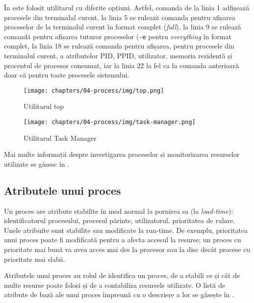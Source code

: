 În  este folosit utilitarul  cu diferite opțiuni.
Astfel, comanda de la linia 1 adfișează procesele din terminalul curent, la linia 5 se rulează comanda pentru afișarea proceselor de la terminalul curent în format complet (\textit{full}), la linia 9 se rulează comandă pentru afișarea tuturor proceselor (\texttt{-e} pentru \textit{everything} în format complet, la linia 18 se rulează comanda pentru afișarea, pentru procesele din terminalul curent, a atributelor PID, PPID, utilizator, memoria rezidentă și procentul de procesor consumat, iar la linia 22 la fel ca la comanda anterioară doar că pentru toate procesele sistemului.

\begin{figure}[!htbp]
  \centering
  \texttt{[image: chapters/04-process/img/top.png]}
  \caption{Utilitarul top}
  \label{fig:process:top}
\end{figure}

\begin{figure}[!htbp]
  \centering
  \texttt{[image: chapters/04-process/img/task-manager.png]}
  \caption{Utilitarul Task Manager}
  \label{fig:process:task-manager}
\end{figure}

Mai multe informații despre investigarea proceselor și monitorizarea resurselor utilizate se găsesc în .

\subsection{Atributele unui proces}
\label{sec:process:attributes}

Un proces are atribute stabilite în mod normal la pornirea sa (la \textit{load-time}): identificatorul procesului, procesul părinte, utilizatorul, prioritatea de rulare.
Unele atribuite sunt stabilite sau modificate la run-time.
De exemplu, prioritatea unui proces poate fi modificată pentru a afecta accesul la resurse;
un proces cu prioritate mai bună va avea acces mai des la procesor sau la disc decât procese cu prioritate mai slabă.

Atributele unui proces au rolul de identifica un proces, de a stabili ce și cât de multe resurse poate folosi și de a contabiliza resursele utilizate.
O listă de atribute de bază ale unui proces împreună cu o descriere a lor se găsește în .

